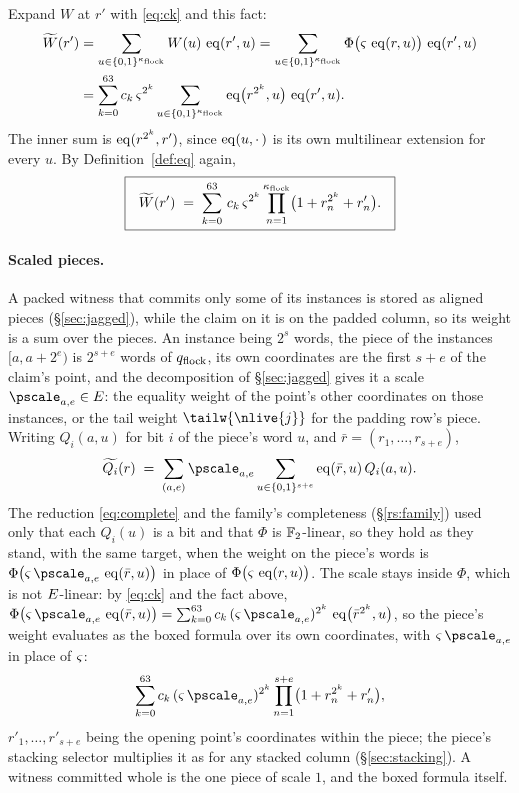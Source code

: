 Expand $W$ at $r'$ with \eqref{eq:ck} and this fact:
\[
\begin{aligned}
\widetilde{W}(r')&=\sum_{u\in\{0,1\}^{\kappa_{\mathrm{flock}}}}W(u)\,\operatorname{eq}(r',u)
=\sum_{u\in\{0,1\}^{\kappa_{\mathrm{flock}}}}\Phi\bigl(\varsigma\,\operatorname{eq}(r,u)\bigr)\,\operatorname{eq}(r',u)\\
&=\sum_{k=0}^{63}c_k\,\varsigma^{2^k}\sum_{u\in\{0,1\}^{\kappa_{\mathrm{flock}}}}\operatorname{eq}\bigl(r^{2^k},u\bigr)\,\operatorname{eq}(r',u).
\end{aligned}
\]
The inner sum is $\operatorname{eq}(r^{2^k},r')$, since $\operatorname{eq}(u,\cdot\,)$ is its own multilinear extension for every $u$. By Definition~\ref{def:eq} again,
\[
\boxed{\ \
\widetilde{W}(r') \;=\; \sum_{k=0}^{63}\, c_k\,\varsigma^{2^k} \prod_{n=1}^{\kappa_{\mathrm{flock}}}
\bigl( 1 + r_n^{2^k} + r'_n \bigr).
\ \ }
\]

\paragraph{Scaled pieces.} A packed witness that commits only some of its instances is stored as aligned pieces (\S\ref{sec:jagged}), while the claim on it is on the padded column, so its weight is a sum over the pieces. An instance being $2^{s}$ words, the piece of the instances $[a,a+2^e)$ is $2^{s+e}$ words of $q_{\mathrm{flock}}$, its own coordinates are the first $s+e$ of the claim's point, and the decomposition of \S\ref{sec:jagged} gives it a scale $\pscale_{a,e}\in\E$: the equality weight of the point's other coordinates on those instances, or the tail weight $\tailw{\nlive{j}}$ for the padding row's piece. Writing $Q_i(a,u)$ for bit $i$ of the piece's word $u$, and $\bar r=(r_1,\dots,r_{s+e})$,
\[
\mle{Q_i}(r)\;=\;\sum_{(a,e)}\pscale_{a,e}\sum_{u\in\cube{s+e}}\eq(\bar r,u)\,Q_i(a,u).
\]
The reduction \eqref{eq:complete} and the family's completeness (\S\ref{rs:family}) used only that each $Q_i(u)$ is a bit and that $\Phi$ is $\mathbb{F}_2$-linear, so they hold as they stand, with the same target, when the weight on the piece's words is $\Phi\bigl(\rsscale\,\pscale_{a,e}\,\eq(\bar r,u)\bigr)$ in place of $\Phi\bigl(\varsigma\,\operatorname{eq}(r,u)\bigr)$. The scale stays inside $\Phi$, which is not $E$-linear: by \eqref{eq:ck} and the fact above, $\Phi\bigl(\rsscale\,\pscale_{a,e}\,\eq(\bar r,u)\bigr)=\sum_{k=0}^{63}c_k\,(\rsscale\,\pscale_{a,e})^{2^k}\,\eq\bigl(\bar r^{2^k},u\bigr)$, so the piece's weight evaluates as the boxed formula over its own coordinates, with $\rsscale\,\pscale_{a,e}$ in place of $\varsigma$:
\[
\sum_{k=0}^{63}c_k\,(\rsscale\,\pscale_{a,e})^{2^k}\prod_{n=1}^{s+e}\bigl(1+r_n^{2^k}+r'_n\bigr),
\]
$r'_1,\dots,r'_{s+e}$ being the opening point's coordinates within the piece; the piece's stacking selector multiplies it as for any stacked column (\S\ref{sec:stacking}). A witness committed whole is the one piece of scale $1$, and the boxed formula itself.

